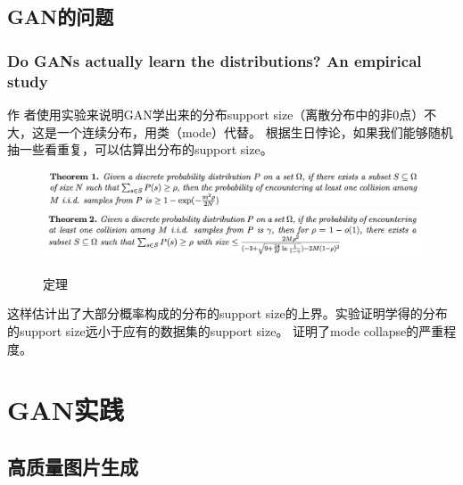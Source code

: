 \documentclass[a4paper]{article}
\begin{document}
\subsection{GAN的问题}
\subsubsection{Do GANs actually learn the distributions? An empirical study\cite{DBLP:journals/corr/AroraZ17}}
作
者使用实验来说明GAN学出来的分布support size（离散分布中的非0点）不大，这是一个连续分布，用类（mode）代替。
根据生日悖论，如果我们能够随机抽一些看重复，可以估算出分布的support size。
\begin{figure}
\centering
\includegraphics[width=\textwidth]{./img/7.png}
\label{fig:7}
\centering
\includegraphics[width=\textwidth]{./img/8.png}
\caption{定理}
\label{fig:8}
\end{figure}

这样估计出了大部分概率构成的分布的support size的上界。实验证明学得的分布的support size远小于应有的数据集的support size。
证明了mode collapse的严重程度。
\section{GAN实践}
\subsection{高质量图片生成}
\end{document}
